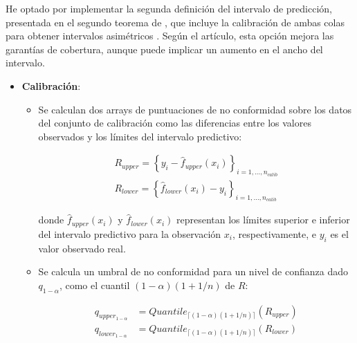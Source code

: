 He optado por implementar la segunda definición del intervalo de predicción, presentada en el segundo teorema 
de \cite{romano2019}, que incluye la calibración de ambas colas para obtener intervalos asimétricos 
\cite{linusson2014}. Según el artículo, esta opción mejora las garantías de cobertura, aunque puede implicar 
un aumento en el ancho del intervalo.

\begin{itemize}

    \item \textbf{Calibración}:
    
    \begin{itemize}
        \item Se calculan dos arrays de puntuaciones de no conformidad sobre los datos del conjunto de 
        calibración como las diferencias entre los valores observados y los límites del intervalo predictivo:
        
        \begin{equation*}
        \begin{split}
            R_{upper} = \left\{ y_i - \hat{f}_{upper}(x_i) \right\}_{i=1,...,n_{calib}} \\
            R_{lower} = \left\{ \hat{f}_{lower}(x_i) - y_i \right\}_{i=1,...,n_{calib}}
        \end{split}
        \end{equation*}

        donde $\hat{f}_{upper}(x_i)$ y $\hat{f}_{lower}(x_i)$ representan los límites superior e inferior del 
        intervalo predictivo para la observación $x_i$, respectivamente, e $y_i$ es el valor observado real.

        \item Se calcula un umbral de no conformidad para un nivel de confianza dado $q_{1-\alpha}$, como el 
        cuantil $(1-\alpha)(1+1/n)$ de $R$:

        \begin{equation*}
        \begin{split}
            q_{upper_{1-\alpha}} &= Quantile_{ \lceil  (1-\alpha) (1 + 1/n)  \rceil } ( R_{upper} ) \\
            q_{lower_{1-\alpha}} &= Quantile_{ \lceil  (1-\alpha) (1 + 1/n)  \rceil } ( R_{lower} )
        \end{split}
        \end{equation*}

    \end{itemize}
    

\end{itemize}
